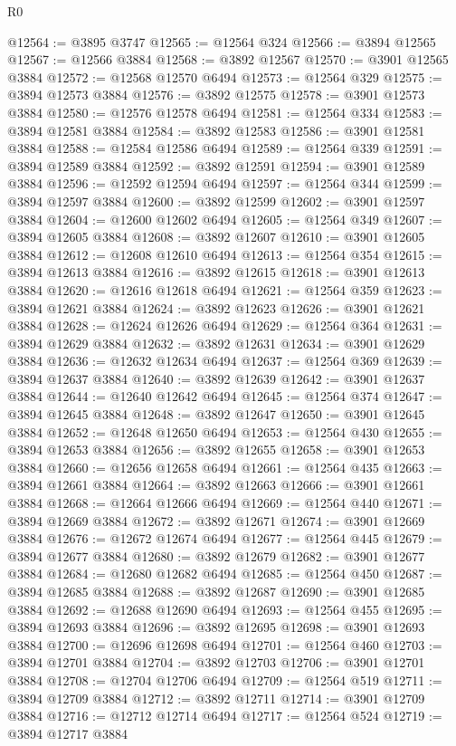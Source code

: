\begin{lexlean}{R0}
\begin{coremodule}
@12564 := @3895 @3747
@12565 := @12564 @324
@12566 := @3894 @12565
@12567 := @12566 @3884
@12568 := @3892 @12567
@12570 := @3901 @12565 @3884
@12572 := @12568 @12570 @6494
@12573 := @12564 @329
@12575 := @3894 @12573 @3884
@12576 := @3892 @12575
@12578 := @3901 @12573 @3884
@12580 := @12576 @12578 @6494
@12581 := @12564 @334
@12583 := @3894 @12581 @3884
@12584 := @3892 @12583
@12586 := @3901 @12581 @3884
@12588 := @12584 @12586 @6494
@12589 := @12564 @339
@12591 := @3894 @12589 @3884
@12592 := @3892 @12591
@12594 := @3901 @12589 @3884
@12596 := @12592 @12594 @6494
@12597 := @12564 @344
@12599 := @3894 @12597 @3884
@12600 := @3892 @12599
@12602 := @3901 @12597 @3884
@12604 := @12600 @12602 @6494
@12605 := @12564 @349
@12607 := @3894 @12605 @3884
@12608 := @3892 @12607
@12610 := @3901 @12605 @3884
@12612 := @12608 @12610 @6494
@12613 := @12564 @354
@12615 := @3894 @12613 @3884
@12616 := @3892 @12615
@12618 := @3901 @12613 @3884
@12620 := @12616 @12618 @6494
@12621 := @12564 @359
@12623 := @3894 @12621 @3884
@12624 := @3892 @12623
@12626 := @3901 @12621 @3884
@12628 := @12624 @12626 @6494
@12629 := @12564 @364
@12631 := @3894 @12629 @3884
@12632 := @3892 @12631
@12634 := @3901 @12629 @3884
@12636 := @12632 @12634 @6494
@12637 := @12564 @369
@12639 := @3894 @12637 @3884
@12640 := @3892 @12639
@12642 := @3901 @12637 @3884
@12644 := @12640 @12642 @6494
@12645 := @12564 @374
@12647 := @3894 @12645 @3884
@12648 := @3892 @12647
@12650 := @3901 @12645 @3884
@12652 := @12648 @12650 @6494
@12653 := @12564 @430
@12655 := @3894 @12653 @3884
@12656 := @3892 @12655
@12658 := @3901 @12653 @3884
@12660 := @12656 @12658 @6494
@12661 := @12564 @435
@12663 := @3894 @12661 @3884
@12664 := @3892 @12663
@12666 := @3901 @12661 @3884
@12668 := @12664 @12666 @6494
@12669 := @12564 @440
@12671 := @3894 @12669 @3884
@12672 := @3892 @12671
@12674 := @3901 @12669 @3884
@12676 := @12672 @12674 @6494
@12677 := @12564 @445
@12679 := @3894 @12677 @3884
@12680 := @3892 @12679
@12682 := @3901 @12677 @3884
@12684 := @12680 @12682 @6494
@12685 := @12564 @450
@12687 := @3894 @12685 @3884
@12688 := @3892 @12687
@12690 := @3901 @12685 @3884
@12692 := @12688 @12690 @6494
@12693 := @12564 @455
@12695 := @3894 @12693 @3884
@12696 := @3892 @12695
@12698 := @3901 @12693 @3884
@12700 := @12696 @12698 @6494
@12701 := @12564 @460
@12703 := @3894 @12701 @3884
@12704 := @3892 @12703
@12706 := @3901 @12701 @3884
@12708 := @12704 @12706 @6494
@12709 := @12564 @519
@12711 := @3894 @12709 @3884
@12712 := @3892 @12711
@12714 := @3901 @12709 @3884
@12716 := @12712 @12714 @6494
@12717 := @12564 @524
@12719 := @3894 @12717 @3884

\end{coremodule}
\end{lexlean}
